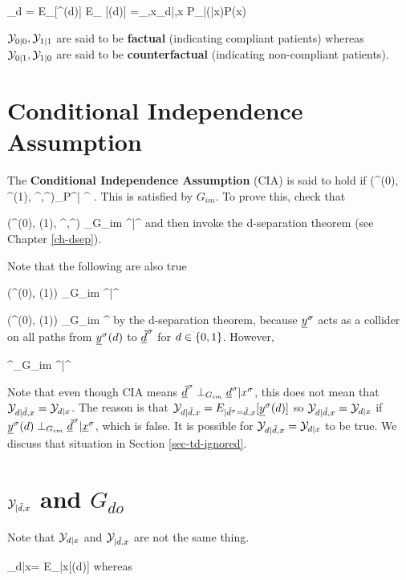 \beq
\caly_{d}
=
E_{\s}[\rvy^\s(d)]
\rarrow
E_{\rvy} [\rvy(d)]
=\sum_{\td,x}\caly_{d|\td,x} P_{\rvd|\rvx}(\td|x)P(x)
\eeq


${\cal Y}_{0|0}, {\cal Y}_{1|1}$
are said to be {\bf factual} 
(indicating compliant patients)
whereas 
${\cal Y}_{0|1}, {\cal Y}_{1|0}$
are said to be {\bf counterfactual} 
(indicating non-compliant patients).


\section{Conditional Independence Assumption}

The {\bf Conditional Independence Assumption}
 (CIA)
is said to hold 
 if
\beq
(\rvy^\s(0), \rvy^\s(1),
\rvy^\s,\rvtd^\s)\perp_P\rvd^\s | \rvx^\s
\;.
\label{eq-CIA2}
\eeq
This is satisfied by $G_{im}$. To
prove this, check that

\beq
(\rvy^\s(0), \rvy(1),
\rvy^\s,\rvtd^\s)
\perp_{G_{im}} \rvd^\s|\rvx^\s
\;
\eeq
and then invoke
the d-separation theorem 
(see Chapter \ref{ch-dsep}).

Note that
the following are also true

\beq
(\rvy^\s(0), \rvy(1))
\perp_{G_{im}} \rvtd^\s|\rvx^\s
\;
\eeq

\beq
(\rvy^\s(0), \rvy(1))
\perp_{G_{im}} \rvtd^\s
\;
\eeq
by the d-separation theorem,
because ${\underline{y}}^\sigma$
acts as a collider
on all paths 
from ${\underline{y}}^\sigma(d)$ to ${\underline{\tilde{d}}}^\sigma$
for $d\in\{0,1\}$.
However,

\beq
\rvy^\s\perp_{G_{im}} \rvtd^\s|\rvx^\s
\;\;
\eeq


Note that even though CIA means
 ${\underline{\tilde{d}}}^\sigma\perp_{G_{im}} {\underline{d}}^\sigma|x^\sigma$,
this does not mean that ${\cal Y}_{d|{\tilde{d}}, x}=
{\cal Y}_{d|x}$.
The reason is that
${\cal Y}_{d|{\tilde{d}}, x} = 
E_{|{\tilde{d}}^\sigma={\tilde{d}}, x}[{\underline{y}}^\sigma(d)]$
so ${\cal Y}_{d|{\tilde{d}}, x}=
{\cal Y}_{d|x}$
if ${\underline{y}}^\sigma(d)\perp_{G_{im}}{\underline{\tilde{d}}}^\sigma|{\underline{x}}^\sigma$,
which is false.
It is possible for
${\cal Y}_{d|{\tilde{d}}, x}=
{\cal Y}_{d|x}$ to be true.
We discuss that situation 
in Section \ref{sec-td-ignored}.



\section{${\cal Y}_{|\tilde{d},x}$ and $G_{do}$}

Note that
 ${\cal Y}_{d|x}$ and ${\cal Y}_{|{\tilde{d}},x}$
are not the same thing.

\beq
\caly_{d|x}=
E_{|x}[\rvy(d)]
\;
\eeq
whereas


